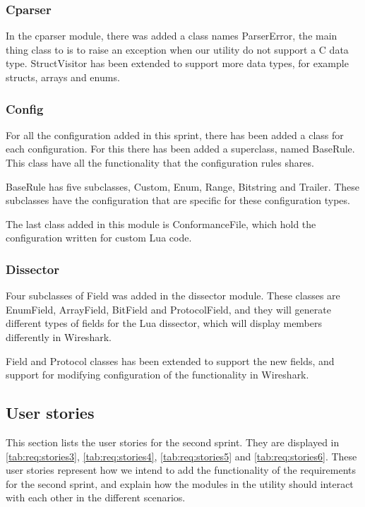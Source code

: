 \subsubsection{Cparser}
In the cparser module, there was added a class names ParserError, the main 
thing class to is to raise an exception when our utility do not support a C 
data type. StructVisitor has been extended to support more data types, for 
example structs, arrays and enums.

\subsubsection{Config}
For all the configuration added in this sprint, there has been added a class 
for each configuration. For this there has been added a superclass, named 
BaseRule. This class have all the functionality that the configuration rules 
shares. 

BaseRule has five subclasses, Custom, Enum, Range, Bitstring and Trailer. 
These subclasses have the configuration that are specific for these 
configuration types.

The last class added in this module is ConformanceFile, which hold the 
configuration written for custom Lua code. 

\subsubsection{Dissector}
Four subclasses of Field was added in the dissector module. These classes 
are EnumField, ArrayField, BitField and ProtocolField, and they will 
generate different types of fields for the Lua dissector, which will display 
members differently in Wireshark.

Field and Protocol classes has been extended to support the new fields, and 
support for modifying configuration of the functionality in Wireshark.

\subsection{User stories}
\label{sec:req:stories2}
This section lists the user stories for the second sprint. They are displayed in \autoref{tab:req:stories3}, \autoref{tab:req:stories4},
\autoref{tab:req:stories5} and \autoref{tab:req:stories6}.
These user stories represent how we intend to add the functionality of the requirements for the second sprint,
and explain how the modules in the utility should interact with each other in the different scenarios.

